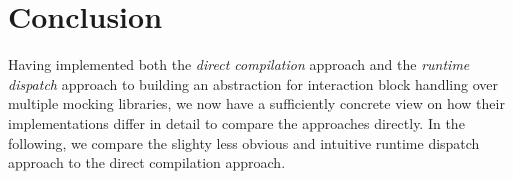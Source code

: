 \chapter{Conclusion}\label{chap:Conclusion}
Having implemented both
the \textit{direct compilation} approach and
the \textit{runtime dispatch} approach to
building an abstraction for interaction block handling
over multiple mocking libraries,
we now have a sufficiently concrete view on
how their implementations differ in detail
to compare the approaches directly.
In the following, we compare
the slighty less obvious and intuitive runtime dispatch approach
to the direct compilation approach.









